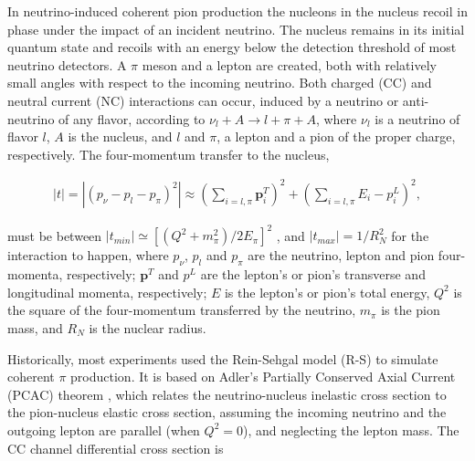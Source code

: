 \documentclass[aps,prl,twocolumn,superscriptaddress,nofootinbib]{revtex4-1}
\begin{document}
\maketitle

In neutrino-induced coherent pion production the nucleons in the nucleus recoil in phase under the
impact of an incident neutrino. The nucleus remains in its initial quantum state and recoils with 
an energy below the detection threshold of most neutrino detectors. A $\pi$ meson and a lepton are
created, both with relatively small angles with respect to the incoming neutrino. Both charged (CC)
and neutral current (NC) interactions can occur, induced by a neutrino or anti-neutrino of any flavor,
according to $\nu_{l}+A\rightarrow l+\pi+A$, where $\nu_{l}$ is a neutrino of flavor $l$, $A$ is the 
nucleus, and $l$ and $\pi$, a lepton and a pion of the proper charge, respectively. The four-momentum
transfer to the nucleus,

\begin{align}
        \lvert t\rvert=\left\vert\left(p_{\nu}{-}p_{l}{-}p_{\pi}\right)^{2}\right\vert\approx\left(\sum_{i=l,\pi}\textbf{p}_{i}^{T}\right)^{2}\!{+}\!\left(\sum_{i=l,\pi}E_{i}{-}p_{i}^{L}\right)^{2},
        \label{eq:1}
\end{align}

\noindent must be between $\lvert t_{min}\rvert\simeq\left[\left(Q^{2}+m^{2}_{\pi}\right)/2E_{\pi}\right]^{2}$
\cite{Paschos:2005km}, and $\lvert t_{max}\rvert=1/R_{N}^{2}$ \cite{CHARM-II:1993xmz} for the interaction
to happen, where $p_{\nu}$, $p_{l}$ and $p_{\pi}$ are the neutrino, lepton and pion four-momenta, respectively;
$\textbf{p}^{T}$ and $p^{L}$ are the lepton's or pion's transverse and longitudinal momenta, respectively; $E$
is the lepton's or pion's total energy, $Q^{2}$ is the square of the four-momentum transferred by the neutrino,
$m_{\pi}$ is the pion mass, and $R_{N}$ is the nuclear radius.

\par Historically, most experiments \cite{CHARM-II:1993xmz, Faissner:1983ng, Isiksal:1984vh, WA59:1984wvj, CHARM:1985bva, SKAT:1985uch, Baltay:1986cv, BEBCWA59:1986jkg, E632:1988dqx, BEBCWA59:1988sqc, E632:1992ydt, K2K:2005uiu, MiniBooNE:2008mmr, SciBooNE:2008bzb, NOMAD:2009idt, SciBooNE:2010lca} used the Rein-Sehgal model (R-S) \cite{Rein:1982pf} to simulate coherent 
$\pi$ production. It is based on Adler's Partially Conserved Axial Current (PCAC) theorem \cite{Adler:1964yx},
which relates the neutrino-nucleus inelastic cross section to the pion-nucleus elastic cross section, assuming
the incoming neutrino and the outgoing lepton are parallel (when $Q^{2}=0$), and neglecting the lepton mass.
The CC channel differential cross section is
\end{document}
